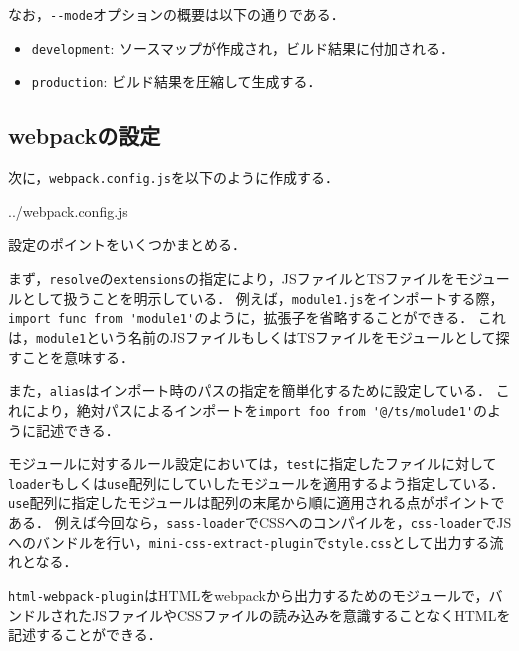 \documentclass[autodetect-engine,dvi=dvipdfmx,ja=standard,
               a4j,11pt]{bxjsarticle}
\begin{document}
なお，\verb|--mode|オプションの概要は以下の通りである．

\begin{itemize}
  \item {\tt development}: ソースマップが作成され，ビルド結果に付加される．
  \item {\tt production}:  ビルド結果を圧縮して生成する．
\end{itemize}

\subsection{webpackの設定}

次に，\verb|webpack.config.js|を以下のように作成する．

\begin{VerbatimInput}[numbers=left, xleftmargin=8mm, numbersep=6pt, fontsize=\small, baselinestretch=0.8]
{../webpack.config.js}
\end{VerbatimInput}

設定のポイントをいくつかまとめる．

まず，\verb|resolve|の\verb|extensions|の指定により，JSファイルとTSファイルをモジュールとして扱うことを明示している．
例えば，\verb|module1.js|をインポートする際，\verb|import func from 'module1'|のように，拡張子を省略することができる．
これは，\verb|module1|という名前のJSファイルもしくはTSファイルをモジュールとして探すことを意味する．

また，\verb|alias|はインポート時のパスの指定を簡単化するために設定している．
これにより，絶対パスによるインポートを\verb|import foo from '@/ts/molude1'|のように記述できる．

モジュールに対するルール設定においては，\verb|test|に指定したファイルに対して\verb|loader|もしくは\verb|use|配列にしていしたモジュールを適用するよう指定している．
\verb|use|配列に指定したモジュールは配列の末尾から順に適用される点がポイントである．
例えば今回なら，\verb|sass-loader|でCSSへのコンパイルを，\verb|css-loader|でJSへのバンドルを行い，\verb|mini-css-extract-plugin|で\verb|style.css|として出力する流れとなる．

\verb|html-webpack-plugin|はHTMLをwebpackから出力するためのモジュールで，バンドルされたJSファイルやCSSファイルの読み込みを意識することなくHTMLを記述することができる．
\end{document}
